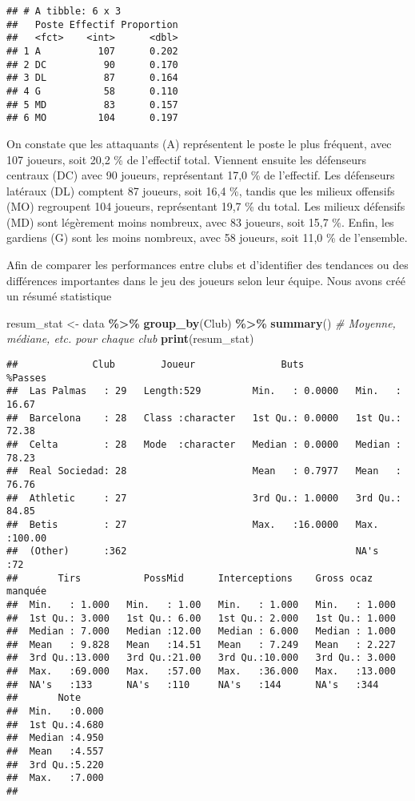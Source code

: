 \documentclass[
]{article}
\newenvironment{Shaded}{\begin{snugshade}}{\end{snugshade}}
\newcommand{\CommentTok}[1]{\textcolor[rgb]{0.56,0.35,0.01}{\textit{#1}}}
\newcommand{\FunctionTok}[1]{\textcolor[rgb]{0.13,0.29,0.53}{\textbf{#1}}}
\newcommand{\NormalTok}[1]{#1}
\newcommand{\OtherTok}[1]{\textcolor[rgb]{0.56,0.35,0.01}{#1}}
\newcommand{\SpecialCharTok}[1]{\textcolor[rgb]{0.81,0.36,0.00}{\textbf{#1}}}
\begin{document}
\begin{verbatim}
## # A tibble: 6 x 3
##   Poste Effectif Proportion
##   <fct>    <int>      <dbl>
## 1 A          107      0.202
## 2 DC          90      0.170
## 3 DL          87      0.164
## 4 G           58      0.110
## 5 MD          83      0.157
## 6 MO         104      0.197
\end{verbatim}

On constate que les attaquants (A) représentent le poste le plus
fréquent, avec 107 joueurs, soit 20,2 \% de l'effectif total. Viennent
ensuite les défenseurs centraux (DC) avec 90 joueurs, représentant 17,0
\% de l'effectif. Les défenseurs latéraux (DL) comptent 87 joueurs, soit
16,4 \%, tandis que les milieux offensifs (MO) regroupent 104 joueurs,
représentant 19,7 \% du total. Les milieux défensifs (MD) sont
légèrement moins nombreux, avec 83 joueurs, soit 15,7 \%. Enfin, les
gardiens (G) sont les moins nombreux, avec 58 joueurs, soit 11,0 \% de
l'ensemble.

Afin de comparer les performances entre clubs et d'identifier des
tendances ou des différences importantes dans le jeu des joueurs selon
leur équipe. Nous avons créé un résumé statistique

\begin{Shaded}
\begin{Highlighting}[]
\NormalTok{resum\_stat }\OtherTok{\textless{}{-}}\NormalTok{ data }\SpecialCharTok{\%\textgreater{}\%} 
  \FunctionTok{group\_by}\NormalTok{(Club) }\SpecialCharTok{\%\textgreater{}\%} 
  \FunctionTok{summary}\NormalTok{()  }\CommentTok{\# Moyenne, médiane, etc. pour chaque club}
\FunctionTok{print}\NormalTok{(resum\_stat)}
\end{Highlighting}
\end{Shaded}

\begin{verbatim}
##             Club        Joueur               Buts            %Passes      
##  Las Palmas   : 29   Length:529         Min.   : 0.0000   Min.   : 16.67  
##  Barcelona    : 28   Class :character   1st Qu.: 0.0000   1st Qu.: 72.38  
##  Celta        : 28   Mode  :character   Median : 0.0000   Median : 78.23  
##  Real Sociedad: 28                      Mean   : 0.7977   Mean   : 76.76  
##  Athletic     : 27                      3rd Qu.: 1.0000   3rd Qu.: 84.85  
##  Betis        : 27                      Max.   :16.0000   Max.   :100.00  
##  (Other)      :362                                        NA's   :72      
##       Tirs           PossMid      Interceptions    Gross ocaz manquée
##  Min.   : 1.000   Min.   : 1.00   Min.   : 1.000   Min.   : 1.000    
##  1st Qu.: 3.000   1st Qu.: 6.00   1st Qu.: 2.000   1st Qu.: 1.000    
##  Median : 7.000   Median :12.00   Median : 6.000   Median : 1.000    
##  Mean   : 9.828   Mean   :14.51   Mean   : 7.249   Mean   : 2.227    
##  3rd Qu.:13.000   3rd Qu.:21.00   3rd Qu.:10.000   3rd Qu.: 3.000    
##  Max.   :69.000   Max.   :57.00   Max.   :36.000   Max.   :13.000    
##  NA's   :133      NA's   :110     NA's   :144      NA's   :344       
##       Note      
##  Min.   :0.000  
##  1st Qu.:4.680  
##  Median :4.950  
##  Mean   :4.557  
##  3rd Qu.:5.220  
##  Max.   :7.000  
## 
\end{verbatim}
\end{document}
